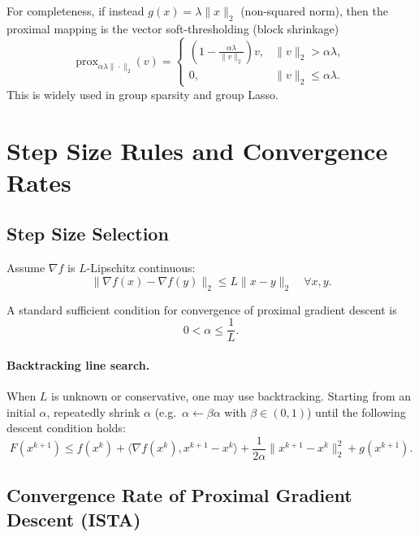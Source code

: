 \documentclass[11pt]{article}
\begin{document}
For completeness, if instead $g(x)=\lambda\|x\|_2$ (non-squared norm), then the proximal mapping is the vector soft-thresholding (block shrinkage)
\begin{equation}
\mathrm{prox}_{\alpha \lambda\|\cdot\|_2}(v)
=
\begin{cases}
\left(1-\frac{\alpha\lambda}{\|v\|_2}\right)v, & \|v\|_2 > \alpha\lambda,\\
0, & \|v\|_2 \le \alpha\lambda.
\end{cases}
\end{equation}
This is widely used in group sparsity and group Lasso.

\section{Step Size Rules and Convergence Rates}

\subsection{Step Size Selection}

Assume $\nabla f$ is $L$-Lipschitz continuous:
\begin{equation}
\|\nabla f(x)-\nabla f(y)\|_2 \le L\|x-y\|_2
\quad \forall x,y.
\end{equation}

A standard sufficient condition for convergence of proximal gradient descent is
\begin{equation}
0 < \alpha \le \frac{1}{L}.
\end{equation}

\paragraph{Backtracking line search.}
When $L$ is unknown or conservative, one may use backtracking. Starting from an initial $\alpha$, repeatedly shrink $\alpha$ (e.g.\ $\alpha \leftarrow \beta\alpha$ with $\beta\in(0,1)$) until the following descent condition holds:
\begin{equation}
F(x^{k+1})
\le
f(x^k) + \langle \nabla f(x^k), x^{k+1}-x^k\rangle
+ \frac{1}{2\alpha}\|x^{k+1}-x^k\|_2^2
+ g(x^{k+1}).
\end{equation}

\subsection{Convergence Rate of Proximal Gradient Descent (ISTA)}
\end{document}

